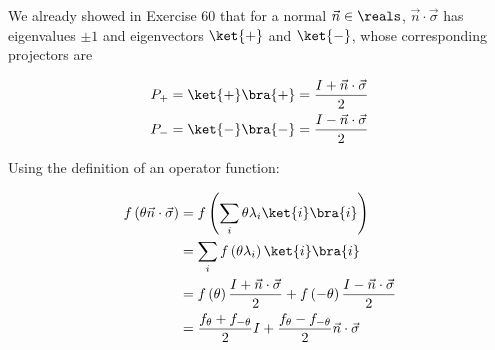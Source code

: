 We already showed in Exercise 60 that for a normal $\vec{n} \in \reals$,
$\vec{n} \cdot \vec{\sigma}$ has eigenvalues $\pm 1$ and eigenvectors $\ket{+}$
and $\ket{-}$, whose corresponding projectors are

\begin{align}
P_+ = \ket{+} \bra{+} &= \frac{I + \vec{n} \cdot \vec{\sigma}}{2} \\
P_- = \ket{-} \bra{-} &= \frac{I - \vec{n} \cdot \vec{\sigma}}{2}
\end{align}

Using the definition of an operator function:

\begin{align}
f \left( \theta \vec{n} \cdot \vec{\sigma} \right) &= f \left( \sum_i{\theta
\lambda_i \ket{i} \bra{i}} \right) \\
&= \sum_i{f \left( \theta \lambda_i \right) \ket{i} \bra{i}} \\
&= f \left( \theta \right) \frac{I + \vec{n} \cdot \vec{\sigma}}{2} + f \left(
-\theta \right) \frac{I - \vec{n} \cdot \vec{\sigma}}{2} \\
&= \frac{f_\theta + f_{-\theta}}{2} I + \frac{f_\theta - f_{-\theta}}{2} \vec{n}
\cdot \vec{\sigma}
\end{align}
